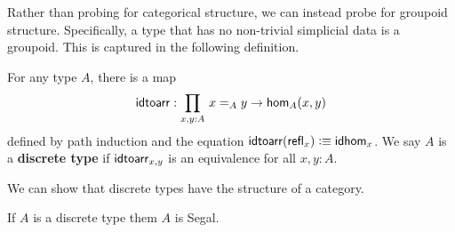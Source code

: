 \documentclass[main.tex]{subfiles}
\begin{document}
Rather than probing for categorical structure, we can instead probe for groupoid structure. Specifically, a type that has no
non-trivial simplicial data is a groupoid. This is captured in the following definition.
\begin{definition}
    For any type $A$, there is a map
    \begin{equation}
        \ida : \prd{x,y:A}x =_A y \to \ho[A]{x}{y}
    \end{equation}
    defined by path induction and the equation $\mathsf{idtoarr}(\mathsf{refl}_{x}) \vcentcolon\equiv \mathsf{idhom}_{x}$. We say $A$ is a \textbf{discrete type} if
    $\mathsf{idtoarr}_{x,y}$ is an equivalence for all $x,y : A$.
\end{definition}

We can show that discrete types have the structure of a category. 
\begin{lemma}
    \label{lem:discretetypesseg}
    If $A$ is a discrete type them $A$ is Segal.
\end{lemma}
\end{document}
